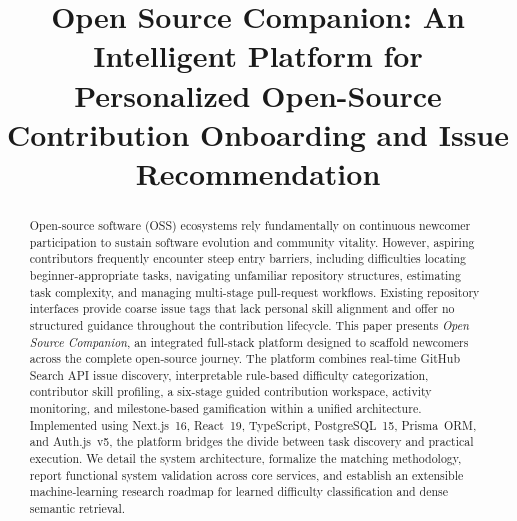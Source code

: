 \documentclass[conference]{IEEEtran}
\begin{document}
\title{Open Source Companion: An Intelligent Platform for Personalized Open-Source Contribution Onboarding and Issue Recommendation}

\author{
}

\maketitle

\begin{abstract}
Open-source software (OSS) ecosystems rely fundamentally on continuous newcomer participation to sustain software evolution and community vitality. However, aspiring contributors frequently encounter steep entry barriers, including difficulties locating beginner-appropriate tasks, navigating unfamiliar repository structures, estimating task complexity, and managing multi-stage pull-request workflows. Existing repository interfaces provide coarse issue tags that lack personal skill alignment and offer no structured guidance throughout the contribution lifecycle. This paper presents \textit{Open Source Companion}, an integrated full-stack platform designed to scaffold newcomers across the complete open-source journey. The platform combines real-time GitHub Search API issue discovery, interpretable rule-based difficulty categorization, contributor skill profiling, a six-stage guided contribution workspace, activity monitoring, and milestone-based gamification within a unified architecture. Implemented using Next.js~16, React~19, TypeScript, PostgreSQL~15, Prisma~ORM, and Auth.js~v5, the platform bridges the divide between task discovery and practical execution. We detail the system architecture, formalize the matching methodology, report functional system validation across core services, and establish an extensible machine-learning research roadmap for learned difficulty classification and dense semantic retrieval.
\end{abstract}
\end{document}
